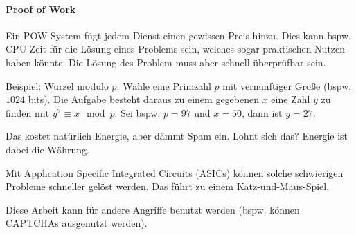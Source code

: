 \paragraph{Proof of Work}%
\label{par:proof_of_work}

Ein POW-System fügt jedem Dienst einen gewissen Preis hinzu.
Dies kann bspw. CPU-Zeit für die Lösung eines Problems sein, welches sogar praktischen
Nutzen haben könnte.
Die Lösung des Problem muss aber schnell überprüfbar sein.

Beispiel: Wurzel modulo $p$.
Wähle eine Primzahl $p$ mit vernünftiger Größe (bspw. $1024$ bits).
Die Aufgabe besteht daraus zu einem gegebenen $x$ eine Zahl $y$ zu finden mit
$y^2 \equiv x \mod p$.
Sei bspw. $p=97$ und $x=50$, dann ist $y=27$.

Das kostet natürlich Energie, aber dämmt Spam ein.
Lohnt sich das?
Energie ist dabei die Währung.

Mit Application Specific Integrated Circuits (ASICs) können solche schwierigen Probleme
schneller gelöst werden.
Das führt zu einem Katz-und-Maus-Spiel.

Diese Arbeit kann für andere Angriffe benutzt werden (bspw. können CAPTCHAs ausgenutzt
werden).
